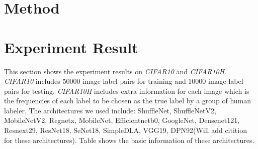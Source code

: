 \documentclass{article}
\begin{document}
\section{Method}

\section{Experiment Result}
This section shows the experiment results on \textit{CIFAR10}\cite{cifar10} and \textit{CIFAR10H}\cite{cifar10h}. \textit{CIFAR10} includes 50000 image-label pairs for training and 10000 image-label pairs for testing. \textit{CIFAR10H} includes extra information for each image which is the frequencies of each label to be chosen as the true label by a group of human labeler. The architectures we used include: ShuffleNet, ShuffleNetV2, MobileNetV2, Regnetx, MobileNet, Efficientnetb0, GoogleNet, Densenet121, Resnext29, ResNet18, SeNet18, SimpleDLA, VGG19, DPN92(Will add citition for these architectures). Table\cite{table:arc_basic} shows the basic information of these architectures.
\end{document}
